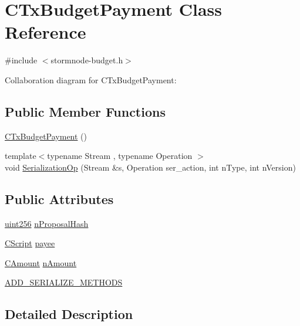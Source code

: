 \hypertarget{class_c_tx_budget_payment}{}\section{C\+Tx\+Budget\+Payment Class Reference}
\label{class_c_tx_budget_payment}


{\ttfamily \#include $<$stormnode-\/budget.\+h$>$}



Collaboration diagram for C\+Tx\+Budget\+Payment\+:
\subsection*{Public Member Functions}
\begin{DoxyCompactItemize}
\item 
\hyperlink{class_c_tx_budget_payment_ad13df26d250f5233f218dd4305c78424}{C\+Tx\+Budget\+Payment} ()
\item 
{\footnotesize template$<$typename Stream , typename Operation $>$ }\\void \hyperlink{class_c_tx_budget_payment_a31bd09c40afac565c4cc2dfd48a5b564}{Serialization\+Op} (Stream \&s, Operation ser\+\_\+action, int n\+Type, int n\+Version)
\end{DoxyCompactItemize}
\subsection*{Public Attributes}
\begin{DoxyCompactItemize}
\item 
\hyperlink{classuint256}{uint256} \hyperlink{class_c_tx_budget_payment_a288dd5a0cd2ba5761d688b77dae5b375}{n\+Proposal\+Hash}
\item 
\hyperlink{class_c_script}{C\+Script} \hyperlink{class_c_tx_budget_payment_a503a9395a6f3ff0e1d81104a3dbf5697}{payee}
\item 
\hyperlink{amount_8h_a4eaf3a5239714d8c45b851527f7cb564}{C\+Amount} \hyperlink{class_c_tx_budget_payment_ac127187725282a338d140efe8ee2c4a7}{n\+Amount}
\item 
\hyperlink{class_c_tx_budget_payment_a27f26b8d9973aa88f7b6bf2e908258ce}{A\+D\+D\+\_\+\+S\+E\+R\+I\+A\+L\+I\+Z\+E\+\_\+\+M\+E\+T\+H\+O\+D\+S}
\end{DoxyCompactItemize}


\subsection{Detailed Description}


